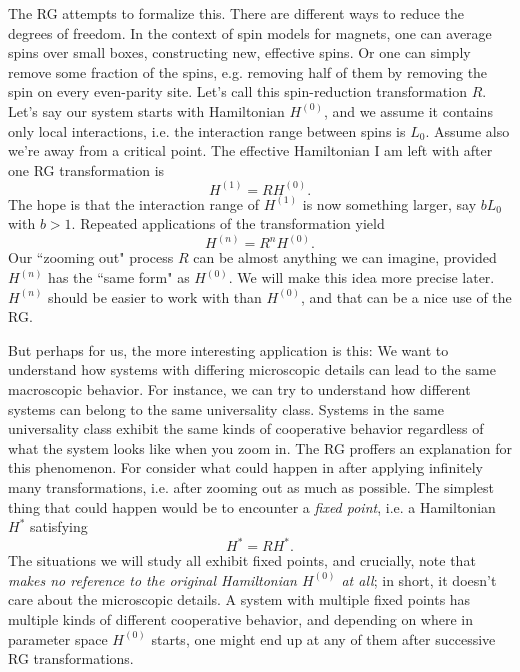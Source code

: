 The RG attempts to formalize this. There are different ways to reduce the
degrees of freedom. In the context of spin models for magnets, one can average
spins over small boxes, constructing new, effective spins. Or one can simply
remove some fraction of the spins, e.g. removing half of them by removing the
spin on every even-parity site. Let's call this spin-reduction transformation
$R$. Let's say our system starts with Hamiltonian $H^{(0)}$, and we assume it
contains only local interactions, i.e. the interaction range between spins is
$L_0$. Assume also we're away from a critical point. The effective Hamiltonian I
am left with after one RG transformation is
\begin{equation}
H^{(1)}=RH^{(0)}.
\end{equation}
The hope is that the interaction range of $H^{(1)}$ is now something larger, say
$bL_0$ with $b>1$. Repeated applications of the transformation yield
\begin{equation}\label{eq:RGiterativeHamiltonian}
H^{(n)}=R^nH^{(0)}.
\end{equation}
Our ``zooming out" process $R$ can be almost anything we can imagine, provided
$H^{(n)}$ has the ``same form" as $H^{(0)}$. We will make this idea more precise
later. $H^{(n)}$ should be easier to work with than $H^{(0)}$, and that can be a
nice use of the RG.

But perhaps for us, the more interesting application is this: We want to
understand how systems with differing microscopic details can lead to the same
macroscopic behavior. For instance, we can try to understand how different
systems can belong to the same universality class. Systems in the same
universality class exhibit the same kinds of cooperative behavior regardless of
what the system looks like when you zoom in. The RG proffers an
explanation for this phenomenon. For consider what could happen in
 after applying infinitely many
transformations, i.e. after zooming out as much as possible. 
The simplest thing that could happen would be 
to encounter a {\it fixed point}, i.e. a Hamiltonian $H^*$ 
satisfying
\begin{equation}\label{eq:RGfixedPoint}
H^*=RH^*.
\end{equation}
The situations we will study all exhibit fixed points, and crucially, note that
 {\it makes no reference to the original Hamiltonian
$H^{(0)}$ at all}; in short, it doesn't care about the microscopic
details. A system with multiple fixed points has multiple kinds of different
cooperative behavior, and depending on where in parameter space $H^{(0)}$
starts, one might end up at any of them after successive RG transformations. 

